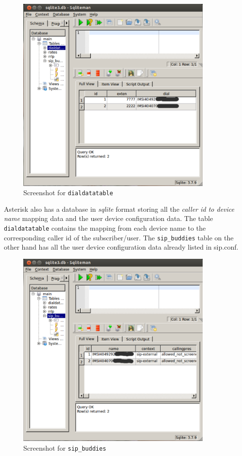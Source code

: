 \begin{figure}
  \centering
    \includegraphics[width=0.87\textwidth]{../images/dialdata}
  \caption[Screenshot - dialdatatable]{Screenshot for \texttt{dialdatatable}}
  \label{dialdata}
\end{figure}

Asterisk also has a database in \textsl{sqlite} format storing all the 
\emph{caller id to device name} mapping data and the user device configuration
data. The table \texttt{dialdatatable} contains the mapping from each device
name to the corresponding caller id of the subscriber/user. The
\texttt{sip\_buddies} table on the other hand has all the user device 
configuration data already listed in \textsf{sip.conf}.

\begin{figure}
  \centering
    \includegraphics[width=0.87\textwidth]{../images/sipbuddies}
  \caption[Screenshot - sip\_buddies]{Screenshot for \texttt{sip\_buddies}}
  \label{sipbuddies}
\end{figure}



